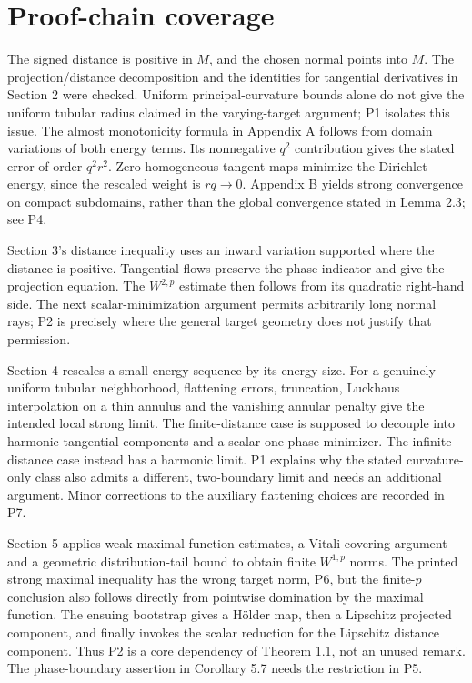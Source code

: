 \documentclass[10pt]{article}
\begin{document}
\section*{Proof-chain coverage}
The signed distance is positive in \(M\), and the chosen normal points into \(M\). The projection/distance decomposition and the identities for tangential derivatives in Section 2 were checked. Uniform principal-curvature bounds alone do not give the uniform tubular radius claimed in the varying-target argument; P1 isolates this issue. The almost monotonicity formula in Appendix A follows from domain variations of both energy terms. Its nonnegative \(q^2\) contribution gives the stated error of order \(q^2r^2\). Zero-homogeneous tangent maps minimize the Dirichlet energy, since the rescaled weight is \(rq\to0\). Appendix B yields strong convergence on compact subdomains, rather than the global convergence stated in Lemma 2.3; see P4.\par
Section 3’s distance inequality uses an inward variation supported where the distance is positive. Tangential flows preserve the phase indicator and give the projection equation. The \(W^{2,p}\) estimate then follows from its quadratic right-hand side. The next scalar-minimization argument permits arbitrarily long normal rays; P2 is precisely where the general target geometry does not justify that permission.\par
Section 4 rescales a small-energy sequence by its energy size. For a genuinely uniform tubular neighborhood, flattening errors, truncation, Luckhaus interpolation on a thin annulus and the vanishing annular penalty give the intended local strong limit. The finite-distance case is supposed to decouple into harmonic tangential components and a scalar one-phase minimizer. The infinite-distance case instead has a harmonic limit. P1 explains why the stated curvature-only class also admits a different, two-boundary limit and needs an additional argument. Minor corrections to the auxiliary flattening choices are recorded in P7.\par
Section 5 applies weak maximal-function estimates, a Vitali covering argument and a geometric distribution-tail bound to obtain finite \(W^{1,p}\) norms. The printed strong maximal inequality has the wrong target norm, P6, but the finite-\(p\) conclusion also follows directly from pointwise domination by the maximal function. The ensuing bootstrap gives a Hölder map, then a Lipschitz projected component, and finally invokes the scalar reduction for the Lipschitz distance component. Thus P2 is a core dependency of Theorem 1.1, not an unused remark. The phase-boundary assertion in Corollary 5.7 needs the restriction in P5.\par
\end{document}
